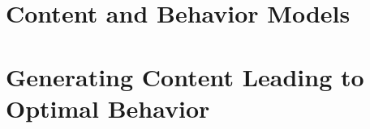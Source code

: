 \documentclass[hidelinks,11pt,a4paper]{report}
\begin{document}
\chapter{Content and Behavior Models}
\label{chatper:Content and Behavior Models}




\chapter{Generating Content Leading to Optimal Behavior}
\label{chatper:Generating Content Leading to Optimal Behavior}


\end{document}
